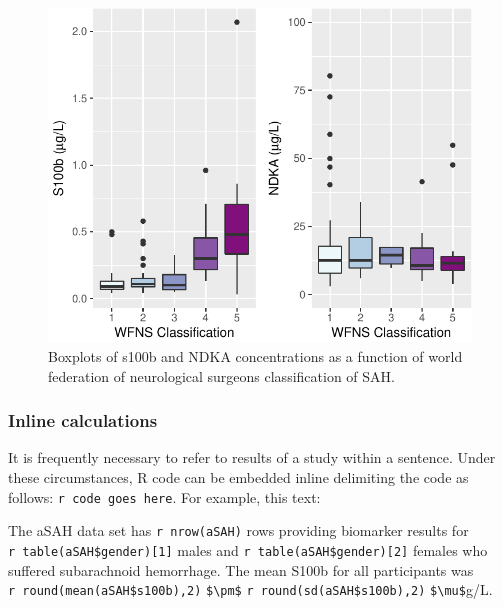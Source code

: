 \documentclass[]{elsarticle} %
\begin{document}
\begin{figure}[H]
\includegraphics{JMSACL_Reproducible_files/figure-latex/fig4-1} \caption{Boxplots of s100b and NDKA concentrations as a function of world federation of neurological surgeons classification of SAH.}\label{fig:fig4}
\end{figure}

\hypertarget{inline-calculations}{%
\subsubsection{Inline calculations}\label{inline-calculations}}

It is frequently necessary to refer to results of a study within a
sentence. Under these circumstances, R code can be embedded inline
delimiting the code as follows:
\texttt{\textasciigrave{}r\ code\ goes\ here\textasciigrave{}}. For
example, this text:

\vspace{12pt}

\noindent The aSAH data set has
\texttt{\textasciigrave{}r\ nrow(aSAH)\textasciigrave{}} rows providing
biomarker results for
\texttt{\textasciigrave{}r\ table(aSAH\$gender){[}1{]}\textasciigrave{}}
males and
\texttt{\textasciigrave{}r\ table(aSAH\$gender){[}2{]}\textasciigrave{}}
females who suffered subarachnoid hemorrhage. The mean S100b for all
participants was
\texttt{\textasciigrave{}r\ round(mean(aSAH\$s100b),2)\textasciigrave{}}
\texttt{\$\textbackslash{}pm\$}
\texttt{\textasciigrave{}r\ round(sd(aSAH\$s100b),2)\textasciigrave{}}
\texttt{\$\textbackslash{}mu\$}g/L.
\end{document}
